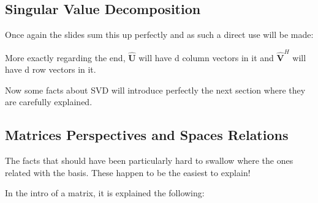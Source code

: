 \documentclass[12pt, a4paper]{article}
\begin{document}




\subsection{Singular Value Decomposition} \label{sec:important_mat_svd}




\par Once again the slides sum this up perfectly and as such a direct use will be made:


\par More exactly regarding the end, $\mathbf{\hat{U}}$ will have d column vectors in it and $\mathbf{\hat{V}}^H$ will have d row vectors in it.

\par Now some facts about SVD will introduce perfectly the next section where they are carefully explained.



\subsection{Matrices Perspectives and Spaces Relations} \label{sec:important_math_spaces_relations}

\par The facts that should have been particularly hard to swallow where the ones related with the basis. These happen to be the easiest to explain!
\par In the intro of a matrix, it is explained the following:
\end{document}
